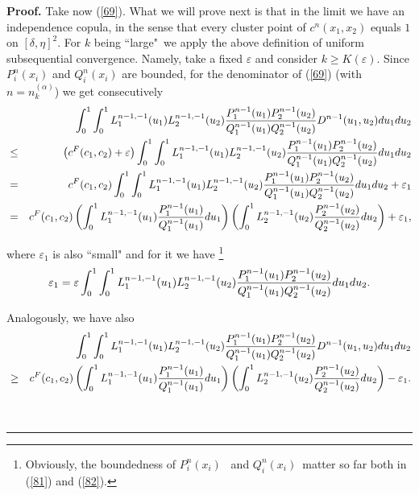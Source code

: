 \documentclass[onecolumn]{article}
\providecommand{\dint}{\displaystyle\int}
\newenvironment{proof}[1][Proof]{\noindent\textbf{#1.} }{\ \rule{0.5em}{0.5em}}
\renewcommand{\dint}{\displaystyle\int}
\begin{document}
\begin{proof}
Take now (\ref{69}). What we will prove next is that in the limit we have an
independence copula, in the sense that every cluster point of $%
c^{n}(x_{1},x_{2})$ equals $1$ on $[\delta ,\eta ]^{2}$. For $k$ being
\textquotedblleft large"\ we apply the above definition of uniform
subsequential convergence. Namely, take a fixed $\varepsilon $ and consider $%
k\geq K(\varepsilon )$. Since $P_{i}^{n}(x_{i})$ and $Q_{i}^{n}(x_{i})$ are
bounded, for the denominator of (\ref{69}) (with $n=n_{k}^{(\alpha )}$) we
get consecutively%
\begin{eqnarray}
&&\dint\nolimits_{0}^{1}\dint%
\nolimits_{0}^{1}L_{1}^{n-1,-1}(u_{1})L_{2}^{n-1,-1}(u_{2})\frac{%
P_{1}^{n-1}(u_{1})P_{2}^{n-1}(u_{2})}{Q_{1}^{n-1}(u_{1})Q_{2}^{n-1}(u_{2})}%
D^{n-1}(u_{1},u_{2})du_{1}du_{2}  \notag \\
&\leq &\left( c^{F}(c_{1},c_{2})+\varepsilon \right)
\dint\nolimits_{0}^{1}\dint%
\nolimits_{0}^{1}L_{1}^{n-1,-1}(u_{1})L_{2}^{n-1,-1}(u_{2})\frac{%
P_{1}^{n-1}(u_{1})P_{2}^{n-1}(u_{2})}{Q_{1}^{n-1}(u_{1})Q_{2}^{n-1}(u_{2})}%
du_{1}du_{2}  \notag \\
&=&c^{F}(c_{1},c_{2})\dint\nolimits_{0}^{1}\dint%
\nolimits_{0}^{1}L_{1}^{n-1,-1}(u_{1})L_{2}^{n-1,-1}(u_{2})\frac{%
P_{1}^{n-1}(u_{1})P_{2}^{n-1}(u_{2})}{Q_{1}^{n-1}(u_{1})Q_{2}^{n-1}(u_{2})}%
du_{1}du_{2}+\varepsilon _{1}  \notag \\
&=&c^{F}(c_{1},c_{2})\left( \dint\nolimits_{0}^{1}L_{1}^{n-1,-1}(u_{1})\frac{%
P_{1}^{n-1}(u_{1})}{Q_{1}^{n-1}(u_{1})}du_{1}\right) \left(
\dint\nolimits_{0}^{1}L_{2}^{n-1,-1}(u_{2})\frac{P_{2}^{n-1}(u_{2})}{%
Q_{2}^{n-1}(u_{2})}du_{2}\right) +\varepsilon _{1},  \label{81}
\end{eqnarray}

where $\varepsilon _{1}$ is also \textquotedblleft small" and for it we have%
\footnote{{\footnotesize Obviously, the boundedness of }$P_{i}^{n}(x_{i})$%
{\footnotesize \ and }$Q_{i}^{n}(x_{i})${\footnotesize \ matter so far both
in (\ref{81}) and (\ref{82}).}}%
\begin{equation}
\varepsilon _{1}=\varepsilon
\dint\nolimits_{0}^{1}\dint%
\nolimits_{0}^{1}L_{1}^{n-1,-1}(u_{1})L_{2}^{n-1,-1}(u_{2})\frac{%
P_{1}^{n-1}(u_{1})P_{2}^{n-1}(u_{2})}{Q_{1}^{n-1}(u_{1})Q_{2}^{n-1}(u_{2})}%
du_{1}du_{2}.  \label{82}
\end{equation}

Analogously, we have also%
\begin{eqnarray}
&&\dint\nolimits_{0}^{1}\dint%
\nolimits_{0}^{1}L_{1}^{n-1,-1}(u_{1})L_{2}^{n-1,-1}(u_{2})\frac{%
P_{1}^{n-1}(u_{1})P_{2}^{n-1}(u_{2})}{Q_{1}^{n-1}(u_{1})Q_{2}^{n-1}(u_{2})}%
D^{n-1}(u_{1},u_{2})du_{1}du_{2}  \notag \\
&\geq &c^{F}(c_{1},c_{2})\left( \dint\nolimits_{0}^{1}L_{1}^{n-1,-1}(u_{1})%
\frac{P_{1}^{n-1}(u_{1})}{Q_{1}^{n-1}(u_{1})}du_{1}\right) \left(
\dint\nolimits_{0}^{1}L_{2}^{n-1,-1}(u_{2})\frac{P_{2}^{n-1}(u_{2})}{%
Q_{2}^{n-1}(u_{2})}du_{2}\right) -\varepsilon _{1}.  \label{83}
\end{eqnarray}


\end{proof}
\end{document}
